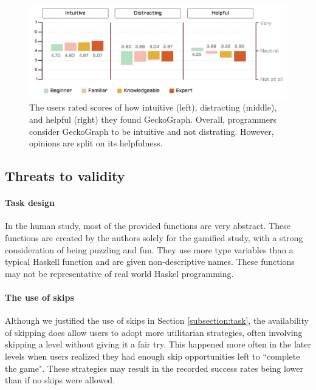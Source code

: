 \begin{figure}[hbt]
  \includegraphics[width=\linewidth]{figures/Qualitative}
  \caption[The users rated scores of how intuitive (left), distracting (middle), and helpful (right) they found GeckoGraph]{\label{fig:qualitative} The users rated scores of how intuitive (left), distracting (middle), and helpful (right) they found GeckoGraph. Overall, programmers consider GeckoGraph to be intuitive and not distrating. However, opinions are split on its helpfulness. }
\end{figure}



\subsection{Threats to validity}

\paragraph{Task design}
In the human study, most of the provided functions are very abstract. These functions are created by the authors solely for the gamified study, with a strong consideration of being puzzling and fun. They use more type variables than a typical Haskell function and are given non-descriptive names. These functions may not be representative of real world Haskel programming. 


\paragraph{The use of skips}
Although we justified the use of skips in Section \ref{subsection:task}, the availability of skipping does allow users to adopt more utilitarian strategies, often involving skipping a level without giving it a fair try. This happened more often in the later levels when users realized they had enough skip opportunities left to ``complete the game". These strategies may result in the recorded success rates being lower than if no skips were allowed.



